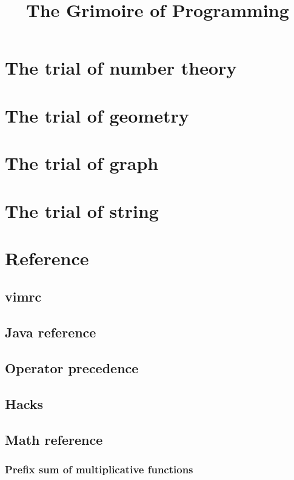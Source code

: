 \documentclass[a4paper]{report}
\title{The Grimoire of Programming}
\date{}
\author{}
\begin{document}
	\maketitle
	\chapter{The trial of number theory}
		
	\chapter{The trial of geometry}
		
	\chapter{The trial of graph}
		
	\chapter{The trial of string}
		
	\chapter{Reference}
		\section{vimrc}
			
		\section{Java reference}
			
		\section{Operator precedence}
			
		\section{Hacks}
			
		\section{Math reference}
			\subsection{Prefix sum of multiplicative functions}
				
\end{document}

